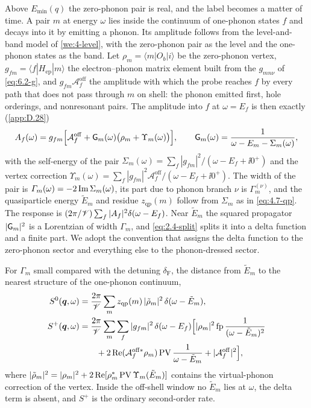 Above $E_{\mathrm{min}}(q)$ the zero-phonon pair is real, and the label becomes a matter of time. A pair $m$ at energy $\omega$ lies inside the continuum of one-phonon states $f$ and decays into it by emitting a phonon. Its amplitude follows from the level-and-band model of \cref{we:4-level}, with the zero-phonon pair as the level and the one-phonon states as the band. Let $\rho_m = \langle m|O_b|i\rangle$ be the zero-phonon vertex, $g_{fm} = \langle f|H_{\mathrm{ep}}|m\rangle$ the electron--phonon matrix element built from the $g_{mn\nu}$ of \cref{eq:6.2-g}, and $g_{fm}\mathcal{A}^{\mathrm{off}}_f$ the amplitude with which the probe reaches $f$ by every path that does not pass through $m$ on shell: the phonon emitted first, hole orderings, and nonresonant pairs. The amplitude into $f$ at $\omega = E_f$ is then exactly (\cref{app:D.28})
\begin{equation}
  A_f(\omega) = g_{fm}\Bigl[\mathcal{A}^{\mathrm{off}}_f + \mathsf{G}_m(\omega)\bigl(\rho_m + \Upsilon_m(\omega)\bigr)\Bigr] , \qquad
  \mathsf{G}_m(\omega) = \frac{1}{\omega - E_m - \Sigma_m(\omega)} ,
  \label{eq:8.6-amp}
\end{equation}
with the self-energy of the pair $\Sigma_m(\omega) = \sum_f|g_{fm}|^2/(\omega - E_f + \ii0^+)$ and the vertex correction $\Upsilon_m(\omega) = \sum_f|g_{fm}|^2\mathcal{A}^{\mathrm{off}}_f/(\omega - E_f + \ii0^+)$. The width of the pair is $\varGamma_m(\omega) = -2\operatorname{Im}\Sigma_m(\omega)$, its part due to phonon branch $\nu$ is $\varGamma^{(\nu)}_m$, and the quasiparticle energy $\tilde E_m$ and residue $z_{\mathrm{qp}}(m)$ follow from $\Sigma_m$ as in \cref{eq:4.7-qp}. The response is $(2\pi/\mathscr{V})\sum_f|A_f|^2\delta(\omega - E_f)$. Near $\tilde E_m$ the squared propagator $|\mathsf{G}_m|^2$ is a Lorentzian of width $\varGamma_m$, and \cref{eq:2.4-split} splits it into a delta function and a finite part. We adopt the convention that assigns the delta function to the zero-phonon sector and everything else to the phonon-dressed sector.
\begin{keyresult}
For $\varGamma_m$ small compared with the detuning $\delta_{\mathrm{F}}$, the distance from $\tilde E_m$ to the nearest structure of the one-phonon continuum,
\begin{equation}
  \begin{aligned}
  S^0(\bm{q},\omega) &= \frac{2\pi}{\mathscr{V}}\sum_mz_{\mathrm{qp}}(m)\,|\tilde\rho_m|^2\,\delta(\omega - \tilde E_m) , \\
  S^+(\bm{q},\omega) &= \frac{2\pi}{\mathscr{V}}\sum_m\sum_f|g_{fm}|^2\,\delta(\omega - E_f)\Bigl[|\rho_m|^2\operatorname{fp}\frac{1}{(\omega - \tilde E_m)^2} \\
  &\qquad + 2\operatorname{Re}(\mathcal{A}^{\mathrm{off}*}_f\rho_m)\operatorname{PV}\frac{1}{\omega - \tilde E_m} + |\mathcal{A}^{\mathrm{off}}_f|^2\Bigr] ,
  \end{aligned}
  \label{eq:8.6-dyson}
\end{equation}
where $|\tilde\rho_m|^2 = |\rho_m|^2 + 2\operatorname{Re}[\rho_m^*\operatorname{PV}\Upsilon_m(\tilde E_m)]$ contains the virtual-phonon correction of the vertex. Inside the off-shell window no $\tilde E_m$ lies at $\omega$, the delta term is absent, and $S^+$ is the ordinary second-order rate.
\end{keyresult}
